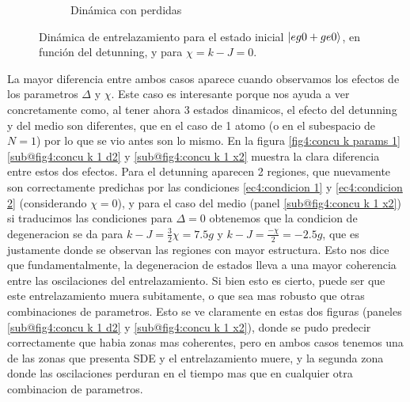 \begin{figure}[h!]
\begin{subfigure}{0.49\textwidth}
        \caption{Dinámica con perdidas}
        \label{fig4:concu k 1 dis}
    \end{subfigure}
    \caption{Dinámica de entrelazamiento para el estado inicial $\ket{eg0+ge0}$, en función del detunning, y para $\chi=k-J=0$.}
    \label{fig4:concu k 1}
\end{figure}
La mayor diferencia entre ambos casos aparece cuando observamos los efectos de los parametros $\Delta$ y $\chi$. Este caso es interesante porque nos ayuda a ver concretamente como, al tener ahora 3 estados dinamicos, el efecto del detunning y del medio son diferentes, que en el caso de 1 atomo (o en el subespacio de $N=1$) por lo que se vio antes son lo mismo. En la figura \ref{fig4:concu k params 1}\ref{sub@fig4:concu k 1 d2} y \ref{sub@fig4:concu k 1 x2} muestra la clara diferencia entre estos dos efectos. Para el detunning aparecen 2 regiones, que nuevamente son correctamente predichas por las condiciones \ref{ec4:condicion 1} y \ref{ec4:condicion 2} (considerando $\chi=0$), y para el caso del medio (panel \ref{sub@fig4:concu k 1 x2}) si traducimos las condiciones para $\Delta=0$ obtenemos que la condicion de degeneracion se da para $k-J=\frac{3}{2}\chi=7.5g$ y $k-J=\frac{-\chi}{2}=-2.5g$, que es justamente donde se observan las regiones con mayor estructura.
Esto nos dice que fundamentalmente, la degeneracion de estados lleva a una mayor coherencia entre las oscilaciones del entrelazamiento. Si bien esto es cierto, puede ser que este entrelazamiento muera subitamente, o que sea mas robusto que otras combinaciones de parametros. Esto se ve claramente en estas dos figuras (paneles \ref{sub@fig4:concu k 1 d2} y \ref{sub@fig4:concu k 1 x2}), donde se pudo predecir correctamente que habia zonas mas coherentes, pero en ambos casos tenemos una de las zonas que presenta SDE y el entrelazamiento muere, y la segunda zona donde las oscilaciones perduran en el tiempo mas que en cualquier otra combinacion de parametros. 
